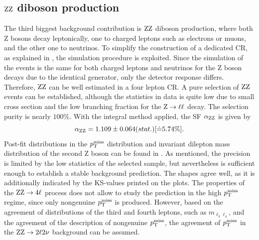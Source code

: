 \subsection{$\mathrm{Z}\mathrm{Z}$ diboson production}
The third biggest background contribution is $\mathrm{Z}\mathrm{Z}$ diboson production, where both Z bosons decay leptonically, one to charged leptons such as electrons or muons, and the other one to neutrinos. To simplify the construction of a dedicated CR, as explained in , the simulation procedure is exploited. Since the simulation of the events is the same for both charged leptons and neutrinos for the Z boson decays due to the identical generator, only the detector response differs. Therefore, $\mathrm{Z}\mathrm{Z}$ can be well estimated in a four lepton CR. A pure selection of $\mathrm{Z}\mathrm{Z}$ events can be established, although the statistics in data is quite low due to small cross section and the low branching fraction for the $\mathrm{Z}\to\ell\ell$ decay. The selection purity is nearly $100\%$.
%
With the integral method applied, the SF $\alpha_{\mathrm{Z}\mathrm{Z}}$ is given by
\begin{equation}\label{eq:AlphaZZ}
 \alpha_{\mathrm{Z}\mathrm{Z}}=1.109 \pm 0.064 (stat.) [\hat{=}5.74\%].
\end{equation}
Post-fit distributions in the $p_{\mathrm{T}}^\text{miss}$ distribution and invariant dilepton mass distribution of the second Z boson can be found in . As mentioned, the precision is limited by the low statistics of the selected sample, but nevertheless is sufficient enough to establish a stable background prediction. The shapes agree well, as it is additionally indicated by the KS-values printed on the plots. The properties of the $\mathrm{Z}\mathrm{Z}\to4\ell$ process does not allow to study the prediction in the high $p_{\mathrm{T}}^\text{miss}$ regime, since only nongenuine $p_{\mathrm{T}}^\text{miss}$ is produced. However, based on the agreement of distributions of the third and fourth leptons, such as $m_{\ell_3\ell_4}$, and the agreement of the description of nongenuine $p_{\mathrm{T}}^\text{miss}$, the agreement of $p_{\mathrm{T}}^\text{miss}$ in the $\mathrm{Z}\mathrm{Z}\to2\ell2\nu$ background can be assumed.
